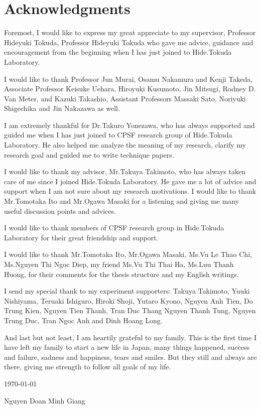 \chapter*{Acknowledgments}
Foremost, I would like to express my great appreciate to my supervisor, Professor Hideyuki Tokuda, Professor Hideyuki Tokuda who gave me advice, guidance and encouragement from the beginning when I has just joined to Hide.Tokuda Laboratory.

I would like to thank Professor Jun Murai, Osamu Nakamura and Kenji Takeda, Associate Professor Keisuke Uehara, Hiroyuki Kusumoto, Jin Mitsugi, Rodney D. Van Meter, and Kazuki Takashio, Assistant 
Professors Massaki Sato, Noriyuki Shigechika and Jin Nakazawa as well.

I am extremely thankful for Dr.Takuro Yonezawa, who has always supported and guided me when I has just joined to CPSF research group of Hide.Tokuda Laboratory. He also helped me analyze the meaning of my research, clarify my research goal and guided me to write technique papers.

I would like to thank my advisor, Mr.Takuya Takimoto, who has always taken care of me since I joined Hide.Tokuda Laboratory. He gave me a lot of advice and support when I am not sure about my research motivations. I would like to thank Mr.Tomotaka Ito and Mr.Ogawa Masaki for a listening and giving me many useful discussion points and advices.

I would like to thank members of CPSF research group in Hide.Tokuda Laboratory for their great friendship and support.

I would like to thank Mr.Tomotaka Ito, Mr.Ogawa Masaki, Ms.Vu Le Thao Chi, Ms.Nguyen Thi Ngoc Diep, my friend Ms.Vu Thi Thai Ha, Ms.Luu Thanh Huong, for their comments for the thesis structure and my English writings.

I send my special thank to my experiment supporters: Takuya Takimoto, Yuuki Nishiyama, Teruaki Ishiguro, Hiroki Shoji, Yutaro Kyono, Nguyen Anh Tien, Do Trung Kien, Nguyen Tien Thanh, Tran Duc Thang Nguyen Thanh Tung, Nguyen Trung Duc, Tran Ngoc Anh and Dinh Hoang Long.

And last but not least, I am heartily grateful to my family. This is the first time I have left my family to start a new life in Japan, many things happened, success and failure, sadness and happiness, tears and smiles. But they still and always are there, giving me strength to follow all goals of my life.

\begin{flushright}
\today

Nguyen Doan Minh Giang
\end{flushright}

